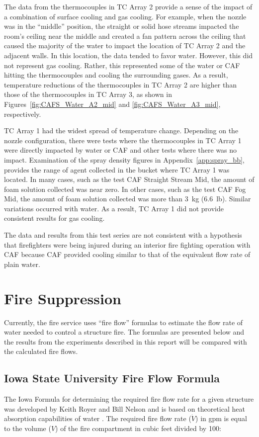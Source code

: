\documentclass[12pt,oneside]{book}
\begin{document}
The data from the thermocouples in TC Array 2 provide a sense of the impact of a combination of surface cooling and gas cooling. For example, when the nozzle was in the ``middle'' position, the straight or solid hose streams impacted the room's ceiling near the middle and created a fan pattern across the ceiling that caused the majority of the water to impact the location of TC Array 2 and the adjacent walls. In this location, the data tended to favor water. However, this did not represent gas cooling. Rather, this represented some of the water or CAF hitting the thermocouples and cooling the surrounding gases. As a result, temperature reductions of the thermocouples in TC Array 2 are higher than those of the thermocouples in TC Array 3, as shown in Figures~\ref{fig:CAFS_Water_A2_mid} and \ref{fig:CAFS_Water_A3_mid}, respectively.

TC Array 1 had the widest spread of temperature change. Depending on the nozzle configuration, there were tests where the thermocouples in TC Array 1 were directly impacted by water or CAF and other tests where there was no impact. Examination of the spray density figures in Appendix~\ref{app:spray_bb}, provides the range of agent collected in the bucket where TC Array 1 was located. In many cases, such as the test CAF Straight Stream Mid, the amount of foam solution collected was near zero. In other cases, such as the test CAF Fog Mid, the amount of foam solution collected was more than 3~kg (6.6~lb). Similar variations occurred with water. As a result, TC Array 1 did not provide consistent results for gas cooling.  

The data and results from this test series are not consistent with a hypothesis that firefighters were being injured during an interior fire fighting operation with CAF because CAF provided cooling similar to that of the equivalent flow rate of plain water.

\section{Fire Suppression}
\label{sec:Fire_Suppression_discussion}

Currently, the fire service uses ``fire flow'' formulas to estimate the flow rate of water needed to control a structure fire. The formulas are presented below and the results from the experiments described in this report will be compared with the calculated fire flows.

\subsection{Iowa State University Fire Flow Formula}
The Iowa Formula for determining the required fire flow rate for a given structure was developed by Keith Royer and Bill Nelson and is based on theoretical heat absorption capabilities of water \cite{Royer:ISU}. The required fire flow rate ($\dot{V}$) in gpm is equal to the volume ($V$) of the fire compartment in cubic feet divided by 100:
\end{document}
